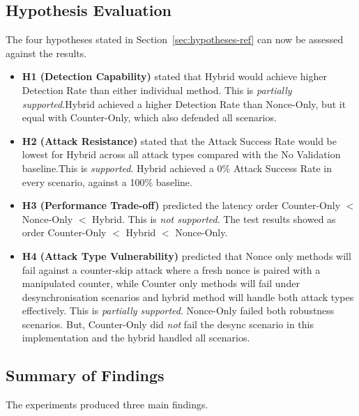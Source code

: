 \documentclass[a4paper,man,12pt]{article}
\begin{document}
\subsection{Hypothesis Evaluation}


The four hypotheses stated in Section~\ref{sec:hypotheses-ref} can now be assessed against the results.

\begin{itemize}
    \item \textbf{H1 (Detection Capability)} stated that Hybrid would achieve higher Detection Rate than either individual method. This is \emph{partially supported}.Hybrid achieved a higher Detection Rate than Nonce-Only, but it equal with Counter-Only, which also defended all scenarios.

    \item \textbf{H2 (Attack Resistance)} stated that the Attack Success Rate would be lowest for Hybrid across all attack types compared with the No Validation baseline.This is \emph{supported}. Hybrid achieved a 0\% Attack Success Rate in every scenario, against a 100\% baseline.

    \item \textbf{H3 (Performance Trade-off)} predicted the latency order Counter-Only $<$ Nonce-Only $<$ Hybrid. This is \emph{not supported}. The test results showed as order  Counter-Only $<$ Hybrid $<$ Nonce-Only.

    \item \textbf{H4 (Attack Type Vulnerability)} predicted that Nonce only methods will fail against a counter-skip attack where a fresh nonce is paired with a manipulated counter, while Counter only methods will fail under desynchronisation scenarios and hybrid method will handle both attack types effectively. This is \emph{partially supported}. Nonce-Only failed both robustness scenarios. But, Counter-Only did \emph{not} fail the desync scenario in this implementation and the hybrid handled all scenarios.

\end{itemize}



\subsection{Summary of Findings}

The experiments produced three main findings. 
\end{document}
